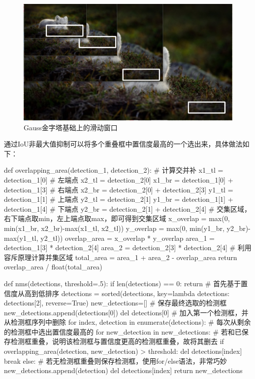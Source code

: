 \documentclass[12pt, a4paper, oneside]{ctexart}
\numberwithin{equation}{section}  %
\begin{document}
\begin{figure}[htbp]
  \centering
  \includegraphics[scale=0.5]{Gauss_Sliding.png}
  \caption{Gauss金字塔基础上的滑动窗口}
  \label{fig-rectangle}
\end{figure}
通过IoU非最大值抑制可以将多个重叠框中置信度最高的一个选出来，具体做法如下：
\begin{pythoncode}
def overlapping_area(detection_1, detection_2):  # 计算交并补
    x1_tl = detection_1[0]  # 左端点
    x2_tl = detection_2[0]
    x1_br = detection_1[0] + detection_1[3]  # 右端点
    x2_br = detection_2[0] + detection_2[3]
    y1_tl = detection_1[1]  # 上端点
    y2_tl = detection_2[1]
    y1_br = detection_1[1] + detection_1[4]  # 下端点
    y2_br = detection_2[1] + detection_2[4]
    # 交集区域，右下端点取min，左上端点取max，即可得到交集区域
    x_overlap = max(0, min(x1_br, x2_br)-max(x1_tl, x2_tl))
    y_overlap = max(0, min(y1_br, y2_br)-max(y1_tl, y2_tl))
    overlap_area = x_overlap * y_overlap
    area_1 = detection_1[3] * detection_2[4]
    area_2 = detection_2[3] * detection_2[4]
    # 利用容斥原理计算并集区域
    total_area = area_1 + area_2 - overlap_area
    return overlap_area / float(total_area)

def nms(detections, threshold=.5):
    if len(detections) == 0:
        return
    # 首先基于置信度从高到低排序
    detections = sorted(detections, key=lambda detections: detections[2], reverse=True)
    new_detections=[]  # 保存最终选取的检测框
    new_detections.append(detections[0])
    del detections[0]  # 加入第一个检测框，并从检测框序列中删除
    for index, detection in enumerate(detections):
        # 每次从剩余的检测框中选出置信度最高的
        for new_detection in new_detections:
        # 若和已保存检测框重叠，说明该检测框与置信度更高的检测框重叠，故将其删去
            if overlapping_area(detection, new_detection) > threshold:
                del detections[index]
                break
        else:  # 若无检测框重叠则保存检测框，使用for/else语法，非常巧妙
            new_detections.append(detection)
            del detections[index]
    return new_detections
\end{pythoncode}
\end{document}
